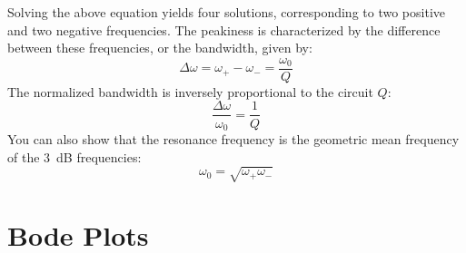 Solving the above equation yields four solutions, corresponding to two positive and two negative frequencies.  The peakiness is characterized by the difference between these frequencies, or the bandwidth, given by:
    \begin{equation} \label{eq:3db}
        \Delta\omega = \omega_+ - \omega_- = \frac{\omega_0}{Q}
    \end{equation}
The normalized bandwidth is inversely proportional to the circuit $Q$:
    \begin{equation}
        \frac{\Delta\omega}{\omega_0} =\frac{1}{Q}
    \end{equation}
You can also show that the resonance frequency is the geometric mean frequency of the $3$~dB frequencies:
    \begin{equation}
        \omega_0 = \sqrt{\omega_+ \omega_-}
    \end{equation}
\section{Bode Plots}
